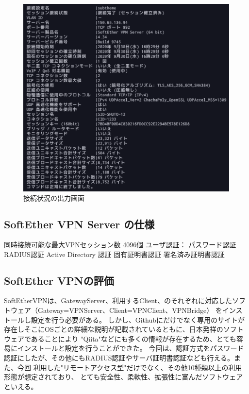 \documentclass[11pt,a4j,titlepage]{jreport}
\begin{document}
\begin{figure}[tbp]
    \centering
    \includegraphics*[width=1.0\textwidth,page=1]{graphs/accountstatusget.png}
    \caption{接続状況の出力画面}
    \label{accountstatusget}
\end{figure}


\subsection*{SoftEther VPN Server の仕様}
同時接続可能な最大VPNセッション数
4096個
ユーザ認証：
パスワード認証
RADIUS認証
Active Directory 認証
固有証明書認証
署名済み証明書認証
\fi





\subsection*{SoftEther VPNの評価}
SoftEtherVPNは、GatewayServer、利用するClient、のそれぞれに対応したソフトウェア（Gateway=VPNServer、Client=VPNClient、VPNBridge）
をインストールし設定を行う必要がある。
しかし、Githubにだけでなく専用のサイトが存在しそこにOSごとの詳細な説明が記載されているともに、日本発祥のソフトウェアであることにより
"Qiita"などにも多くの情報が存在するため、とても容易にインストールと設定を行うことができた。
今回は、認証方式をパスワード認証にしたが、その他にもRADIUS認証やサーバ証明書認証なども行える。また、今回
利用した"リモートアクセス型"だけでなく、その他10種類以上の利用形態が想定されており、
とても安全性、柔軟性、拡張性に富んだソフトウェアといえる。
\end{document}
